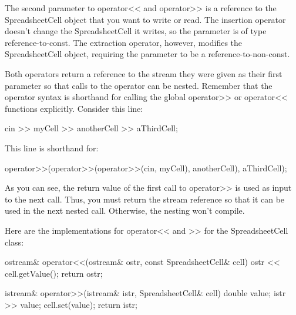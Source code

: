 The second parameter to operator<{}< and operator>{}> is a reference to the SpreadsheetCell object that you want to write or read. The insertion operator doesn’t change the SpreadsheetCell it writes, so the parameter is of type reference-to-const. The extraction operator, however, modifies the SpreadsheetCell object, requiring the parameter to be a reference-to-non-const.

Both operators return a reference to the stream they were given as their first parameter so that calls to the operator can be nested. Remember that the operator syntax is shorthand for calling the global operator>{}> or operator<{}< functions explicitly. Consider this line:

\begin{cpp}
cin >> myCell >> anotherCell >> aThirdCell;
\end{cpp}

This line is shorthand for:

\begin{cpp}
operator>>(operator>>(operator>>(cin, myCell), anotherCell), aThirdCell);
\end{cpp}

As you can see, the return value of the first call to operator>{}> is used as input to the next call. Thus, you must return the stream reference so that it can be used in the next nested call. Otherwise, the nesting won’t compile.

Here are the implementations for operator<{}< and >{}> for the SpreadsheetCell class:

\begin{cpp}
ostream& operator<<(ostream& ostr, const SpreadsheetCell& cell)
{
    ostr << cell.getValue();
    return ostr;
}

istream& operator>>(istream& istr, SpreadsheetCell& cell)
{
    double value;
    istr >> value;
    cell.set(value);
    return istr;
}
\end{cpp}










